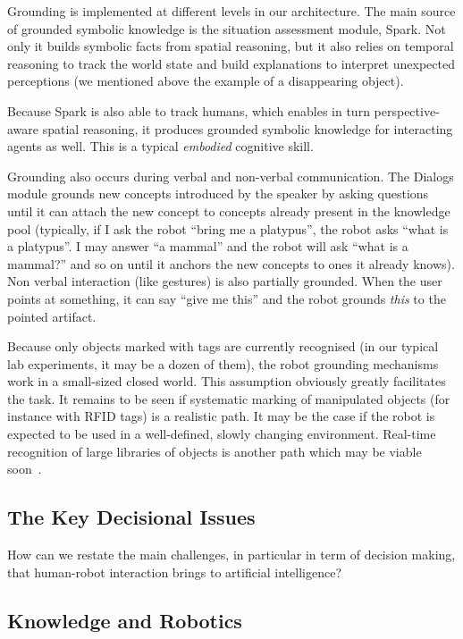 \documentclass[preprint,3p,times]{elsarticle}
\begin{document}
Grounding is implemented at different levels in our architecture. The main source
of grounded symbolic knowledge is the situation assessment module, {\sc Spark}.
Not only it builds symbolic facts from spatial reasoning, but it also relies on
temporal reasoning to track the world state and build explanations to interpret
unexpected perceptions (we mentioned above the example of a disappearing
object).

Because {\sc Spark} is also able to track humans, which enables in turn
perspective-aware spatial reasoning, it produces grounded symbolic knowledge
for interacting agents as well. This is a typical \emph{embodied} cognitive
skill.

Grounding also occurs during verbal and non-verbal communication. The {\sc
Dialogs} module grounds new concepts introduced by the speaker by asking questions
until it can attach the new concept to concepts already present in the
knowledge pool (typically, if I ask the robot ``bring me a platypus'', the
robot asks ``what is a platypus''. I may answer ``a mammal'' and the robot will
ask ``what is a mammal?'' and so on until it anchors the new concepts to ones
it already knows). Non verbal interaction (like gestures) is also partially
grounded. When the user points at something, it can say ``give me this'' and
the robot grounds \emph{this} to the pointed artifact.

Because only objects marked with tags are currently recognised (in our typical
lab experiments, it may be a dozen of them), the robot grounding mechanisms work
in a small-sized closed world. This assumption obviously greatly facilitates
the task. It remains to be seen if systematic marking of manipulated objects
(for instance with RFID tags) is a realistic path. It may be the case if the
robot is expected to be used in a well-defined, slowly changing environment.
Real-time recognition of large libraries of objects is another path which may
be viable soon~\cite{Dean2013Fast}.

\subsection{The Key Decisional Issues}

How can we restate the main challenges, in particular in term of decision
making, that human-robot interaction brings to artificial intelligence?




\subsection{Knowledge and Robotics}
\label{krs-discussion}
\end{document}
